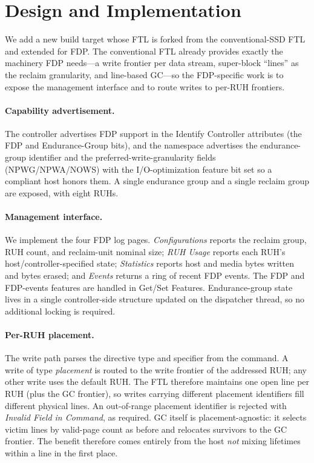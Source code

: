 \documentclass[letterpaper,twocolumn,10pt]{article}
\begin{document}
\section{Design and Implementation}
\label{sec:design}
We add a new build target whose FTL is forked from the conventional-SSD FTL and
extended for FDP. The conventional FTL already provides exactly the machinery
FDP needs---a write frontier per data stream, super-block ``lines'' as the
reclaim granularity, and line-based GC---so the FDP-specific work is to expose
the management interface and to route writes to per-RUH frontiers.

\paragraph{Capability advertisement.}
The controller advertises FDP support in the Identify Controller attributes
(the FDP and Endurance-Group bits), and the namespace advertises the
endurance-group identifier and the preferred-write-granularity fields
(NPWG/NPWA/NOWS) with the I/O-optimization feature bit set so a compliant host
honors them. A single endurance group and a single reclaim group are exposed,
with eight RUHs.

\paragraph{Management interface.}
We implement the four FDP log pages. \emph{Configurations} reports the reclaim
group, RUH count, and reclaim-unit nominal size; \emph{RUH Usage} reports each
RUH's host/controller-specified state; \emph{Statistics} reports host and media
bytes written and bytes erased; and \emph{Events} returns a ring of recent FDP
events. The FDP and FDP-events features are handled in Get/Set Features.
Endurance-group state lives in a single controller-side structure updated on the
dispatcher thread, so no additional locking is required.

\paragraph{Per-RUH placement.}
The write path parses the directive type and specifier from the command. A
write of type \emph{placement} is routed to the write frontier of the addressed
RUH; any other write uses the default RUH. The FTL therefore maintains one open
line per RUH (plus the GC frontier), so writes carrying different placement
identifiers fill different physical lines. An out-of-range placement identifier
is rejected with \emph{Invalid Field in Command}, as required. GC itself is
placement-agnostic: it selects victim lines by valid-page count as before and
relocates survivors to the GC frontier. The benefit therefore comes entirely
from the host \emph{not} mixing lifetimes within a line in the first place.
\end{document}
